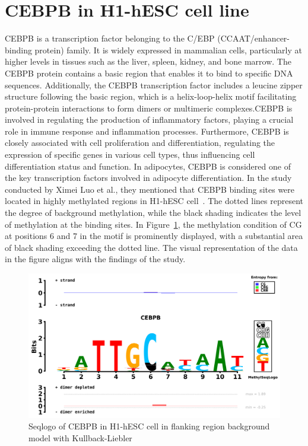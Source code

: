\documentclass{PHlab-thesis}
\begin{document}
\section{CEBPB in H1-hESC cell line}
CEBPB is a transcription factor belonging to the C/EBP (CCAAT/enhancer-binding protein) family. It is widely expressed in mammalian cells, particularly at higher levels in tissues such as the liver, spleen, kidney, and bone marrow. The CEBPB protein contains a basic region that enables it to bind to specific DNA sequences. Additionally, the CEBPB transcription factor includes a leucine zipper structure following the basic region, which is a helix-loop-helix motif facilitating protein-protein interactions to form dimers or multimeric complexes.CEBPB is involved in regulating the production of inflammatory factors, playing a crucial role in immune response and inflammation processes. Furthermore, CEBPB is closely associated with cell proliferation and differentiation, regulating the expression of specific genes in various cell types, thus influencing cell differentiation status and function. In adipocytes, CEBPB is considered one of the key transcription factors involved in adipocyte differentiation. In the study conducted by Ximei Luo et al., they mentioned that CEBPB binding sites were located in highly methylated regions in H1-hESC cell~\cite{luo2021effects}. The dotted lines represent the degree of background methylation, while the black shading indicates the level of methylation at the binding sites.
In Figure~\ref{fig:CEBPBFlanking}, the methylation condition of CG at positions 6 and 7 in the motif is prominently displayed, with a substantial area of black shading exceeding the dotted line. The visual representation of the data in the figure aligns with the findings of the study.
\begin{figure}[H]
	\centering
	\includegraphics[scale=0.55]{figures/yulingCEBPB_human_H1-hESC_50_Methyl_Kullback-Liebler_seqlogo.png}
	\caption{Seqlogo of CEBPB in H1-hESC cell in flanking region background model with Kullback-Liebler}
	\label{fig:CEBPBFlanking} 
\end{figure}
\end{document}
